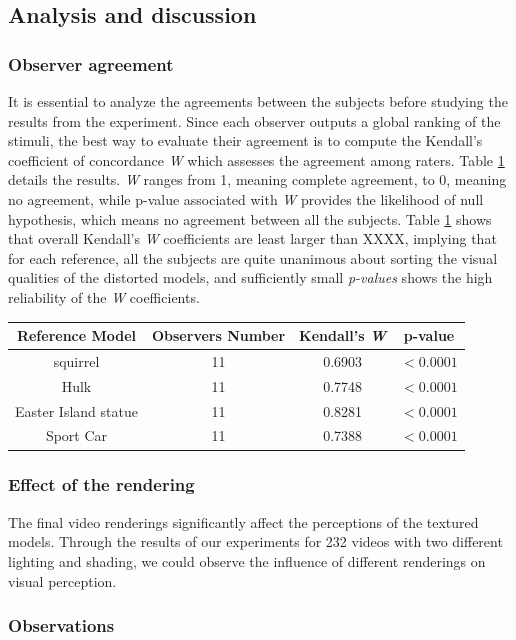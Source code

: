 \subsection{Analysis and discussion}
\subsubsection{Observer agreement}
It is essential to analyze the agreements between the subjects before studying the results from the experiment. Since each observer outputs a global ranking of the stimuli, the best way to evaluate their agreement is to compute the Kendall's coefficient of concordance \textit{W} \cite{Kendall_1940} which assesses the agreement among raters. Table \ref{tab-W} details the results. \textit{W} ranges from 1, meaning complete agreement, to 0, meaning no agreement, while p-value associated with \textit{W} provides the likelihood of null hypothesis, which means no agreement between all the subjects. Table \ref{tab-W} shows that overall Kendall’s \textit{W} coefficients are least larger than XXXX, implying that for each reference, all the subjects are quite unanimous about sorting the visual qualities of the distorted models, and sufficiently small \textit{p-values} shows the high reliability of the \textit{W} coefficients.\\
\begin{table}

    \begin{tabular}{c c  c c}
        \textbf{Reference Model} & \textbf{Observers Number} & \textbf{Kendall's \textit{W}} & \textbf{p-value} \\ \hline
        squirrel & 11 & 0.6903 & $<0.0001$ \\ 
        Hulk & 11 & 0.7748 & $<0.0001$ \\ 
        Easter Island statue & 11 & 0.8281 & $<0.0001$ \\ 
        Sport Car & 11 & 0.7388 & $<0.0001$ \\ \hline
    \end{tabular}%
		
   \label{tab-W}
\end{table}


\subsubsection{Effect of the rendering}
The final video renderings significantly affect the perceptions of the textured models. Through the results of our experiments for 232 videos with two different lighting and shading, we could observe the influence of different renderings on visual perception.  

\subsubsection{Observations}